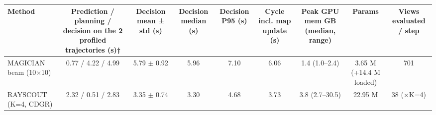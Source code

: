 \begin{tabular}{@{}lcccccccc@{}}
\toprule
Method & Prediction / planning / decision on the 2 profiled trajectories (s)† & Decision mean ± std (s) & Decision median (s) & Decision P95 (s) & Cycle incl. map update (s) & Peak GPU mem GB (median, range) & Params & Views evaluated / step \\
\midrule
MAGICIAN beam (10$\times$10) & 0.77 / 4.22 / 4.99 & 5.79 $\pm$ 0.92 & 5.96 & 7.10 & 6.06 & 1.4 (1.0–2.4) & 3.65 M (+14.4 M loaded) & 701 \\
RAYSCOUT (K=4, CDGR) & 2.32 / 0.51 / 2.83 & 3.35 $\pm$ 0.74 & 3.30 & 4.68 & 3.73 & 3.8 (2.7–30.5) & 22.95 M & 38 ($\times$K=4) \\
\bottomrule
\end{tabular}
